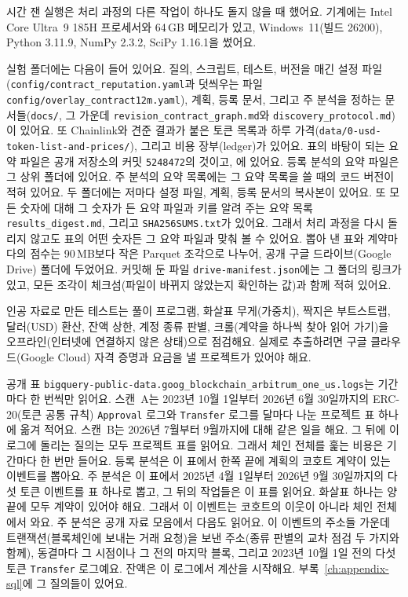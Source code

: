 시간 잰 실행은 처리 과정의 다른 작업이 하나도 돌지 않을 때 했어요. 기계에는 Intel Core Ultra~9 185H 프로세서와 64\,GB 메모리가 있고, Windows~11(빌드 26200), Python 3.11.9, NumPy 2.3.2, SciPy 1.16.1을 썼어요.

실험 폴더에는 다음이 들어 있어요. 질의, 스크립트, 테스트, 버전을 매긴 설정 파일(\texttt{config/contract\_reputation.yaml}과 덧씌우는 파일 \texttt{config/overlay\_contract12m.yaml}), 계획, 등록 문서, 그리고 주 분석을 정하는 문서들(\texttt{docs/}, 그 가운데 \texttt{revision\_contract\_graph.md}와 \texttt{discovery\_protocol.md})이 있어요. 또 Chainlink와 견준 결과가 붙은 토큰 목록과 하루 가격(\texttt{data/0-usd-token-list-and-prices/}), 그리고 비용 장부(ledger)가 있어요. 표의 바탕이 되는 요약 파일은 공개 저장소의 커밋 \texttt{5248472}의 것이고, 에 있어요. 등록 분석의 요약 파일은 그 상위 폴더에 있어요. 주 분석의 요약 목록에는 그 요약 목록을 쓸 때의 코드 버전이 적혀 있어요. 두 폴더에는 저마다 설정 파일, 계획, 등록 문서의 복사본이 있어요. 또 모든 숫자에 대해 그 숫자가 든 요약 파일과 키를 알려 주는 요약 목록 \texttt{results\_digest.md}, 그리고 \texttt{SHA256SUMS.txt}가 있어요. 그래서 처리 과정을 다시 돌리지 않고도 표의 어떤 숫자든 그 요약 파일과 맞춰 볼 수 있어요. 뽑아 낸 표와 계약마다의 점수는 90\,MB보다 작은 Parquet 조각으로 나누어, 공개 구글 드라이브(Google Drive) 폴더에 두었어요. 커밋해 둔 파일 \texttt{drive-manifest.json}에는 그 폴더의 링크가 있고, 모든 조각이 체크섬(파일이 바뀌지 않았는지 확인하는 값)과 함께 적혀 있어요.

인공 자료로 만든 테스트는 풀이 프로그램, 화살표 무게(가중치), 짝지은 부트스트랩, 달러(USD) 환산, 잔액 상한, 계정 종류 판별, 크롤(계약을 하나씩 찾아 읽어 가기)을 오프라인(인터넷에 연결하지 않은 상태)으로 점검해요. 실제로 추출하려면 구글 클라우드(Google Cloud) 자격 증명과 요금을 낼 프로젝트가 있어야 해요.


공개 표 \texttt{bigquery-public-data.goog\_blockchain\_arbitrum\_one\_us.logs}는 기간마다 한 번씩만 읽어요. 스캔~A는 2023년 10월 1일부터 2026년 6월 30일까지의 ERC-20(토큰 공통 규칙) \texttt{Approval} 로그와 \texttt{Transfer} 로그를 달마다 나눈 프로젝트 표 하나에 옮겨 적어요. 스캔~B는 2026년 7월부터 9월까지에 대해 같은 일을 해요. 그 뒤에 이 로그에 돌리는 질의는 모두 프로젝트 표를 읽어요. 그래서 체인 전체를 훑는 비용은 기간마다 한 번만 들어요. 등록 분석은 이 표에서 한쪽 끝에 계획의 코호트 계약이 있는 이벤트를 뽑아요. 주 분석은 이 표에서 2025년 4월 1일부터 2026년 9월 30일까지의 다섯 토큰 이벤트를 표 하나로 뽑고, 그 뒤의 작업들은 이 표를 읽어요. 화살표 하나는 양 끝에 모두 계약이 있어야 해요. 그래서 이 이벤트는 코호트의 이웃이 아니라 체인 전체에서 와요. 주 분석은 공개 자료 모음에서 다음도 읽어요. 이 이벤트의 주소들 가운데 트랜잭션(블록체인에 보내는 거래 요청)을 보낸 주소(종류 판별의 교차 점검 두 가지와 함께), 동결마다 그 시점이나 그 전의 마지막 블록, 그리고 2023년 10월 1일 전의 다섯 토큰 \texttt{Transfer} 로그예요. 잔액은 이 로그에서 계산을 시작해요. 부록~\ref{ch:appendix-sql}에 그 질의들이 있어요.


